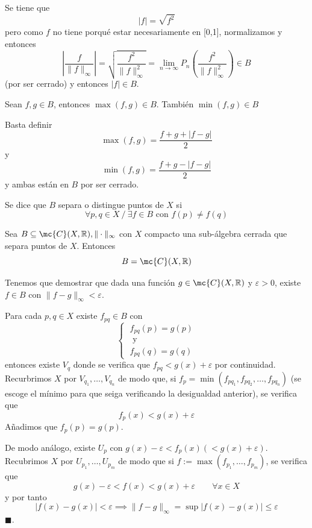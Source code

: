     \begin{dem}
        Se tiene que 
        $$|f|=\sqrt{f^2}$$
        pero como $f$ no tiene porqué estar necesariamente en [0,1], normalizamos y entonces
        $$\left|\dfrac{f}{\|f\|_{\infty}} \right|=\sqrt{\dfrac{f^2}{\|f\|^2_{\infty}}}=\lim_{n \to \infty} P_n\left( \dfrac{f^2}{\|f\|^2_{\infty}}\right) \in B$$
        (por ser cerrado) y entonces $|f| \in B$.
    \end{dem}
    \begin{lem}
        Sean $f,g \in B$, entonces $\max(f,g) \in B$. También $\min(f,g) \in B$
    \end{lem}
    \begin{dem}
        Basta definir
        $$\max(f,g) = \dfrac{f+g+|f-g|}{2}$$
        y
        $$\min(f,g)=\dfrac{f+g-|f-g|}{2}$$
        y ambas están en $B$ por ser cerrado.
    \end{dem}
    \begin{defi}
        Se dice que $B$ separa o distingue puntos de $X$ si 
        $$\forall p,q  \in X \: / \: \exists f \in B \text{ con } f(p) \neq f(q)$$
    \end{defi}
    \begin{teo}
         Sea $B \subseteq \mc{C}(X, \mathbb R), \|\cdot \|_{\infty}$ con $X$ compacto una sub-álgebra cerrada que separa puntos de $X$. Entonces
        $$B=\mc{C}(X, \mathbb R)$$
    \end{teo}
    \begin{dem}
        Tenemos que demostrar que dada una función $g \in \mc{C}(X, \mathbb R)$ y $\varepsilon > 0$, existe $f \in B$ con $\|f-g\|_{\infty}<\varepsilon$. 

        Para cada $p,q \in X$ existe $f_{pq} \in B$ con 
        $$\begin{cases}
            \; f_{pq}(p)=g(p) \\ \; \text{ y} \\ \; f_{pq}(q)=g(q)
        \end{cases}$$
        entonces existe $V_q$ donde se verifica que $f_{pq}< g(x) + \varepsilon$ por continuidad. Recurbrimos $X$ por $V_{q_1}, \ldots, V_{q_n}$ de modo que, si $f_p=\min(f_{pq_1}, f_{pq_2}, \ldots, f_{pq_n})$ (se escoge el mínimo para que seiga verificando la desigualdad anterior), se verifica que
        $$f_p(x) < g(x) + \varepsilon$$
        Añadimos que $f_p(p)=g(p)$.

        De modo análogo, existe $U_p$ con $g(x)-\varepsilon<f_p(x) (<g(x)+\varepsilon)$. Recubrimos $X$ por $U_{p_1}, \ldots, U_{p_m} $ de modo que si $f:=\max(f_{p_1}, \ldots ,f_{p_m})$, se verifica que 
        $$g(x)-  \varepsilon < f(x) < g(x) + \varepsilon \qquad \forall x \in X$$
        y por tanto 
        $$|f(x)-g(x)|< \varepsilon  \implies  \|f-g\|_{\infty}=\sup|f(x)-g(x)| \leq \varepsilon$$
        \hfill $\blacksquare.$
    \end{dem}
